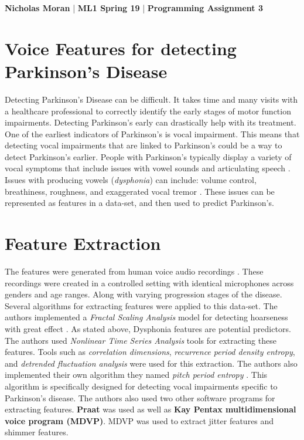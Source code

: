 \setlength{\parindent}{10ex}

\textbf{Nicholas Moran} |
\textbf{ML1 Spring 19} |
\textbf{Programming Assignment 3} 

\section{Voice Features for detecting Parkinson's Disease}
    Detecting Parkinson's Disease can be difficult. 
    It takes time and many visits with a healthcare professional to correctly identify the early stages of motor function impairments.
    Detecting Parkinson's early can drastically help with its treatment.
    One of the earliest indicators of Parkinson's is vocal impairment.
    This means that detecting vocal impairments that are linked to Parkinson's could be a way to detect Parkinson's  earlier.
    People with Parkinson's typically display a variety of vocal symptoms that include issues with vowel sounds and articulating speech \cite{little}.
    Issues with producing vowels (\textit{dysphonia}) can include: volume control, breathiness, roughness, and exaggerated vocal tremor \cite{little}.
    These issues can be represented as features in a data-set, and then used to predict Parkinson's.


\section{Feature Extraction}
    The features were generated from human voice audio recordings \cite{little}.
    These recordings were created in a controlled setting with identical microphones across genders and age ranges.
    Along with varying progression stages of the disease. 
    Several algorithms for extracting features were applied to this data-set.
    The authors implemented a \textit{Fractal Scaling Analysis} model for detecting hoarseness with great effect \cite{McSharry}.
    As stated above, Dysphonia features are potential predictors. 
    The authors used \textit{Nonlinear Time Series Analysis} tools for extracting these features.
    Tools such as \textit{correlation dimensions}, \textit{recurrence period density entropy}, and \textit{detrended fluctuation analysis} were used for this extraction.
    The authors also implemented their own algorithm they named \textit{pitch period entropy} \cite{little}.
    This algorithm is specifically designed for detecting vocal impairments specific to Parkinson's disease.
    The authors also used two other software programs for extracting features.
    \textbf{Praat} was used as well as \textbf{Kay Pentax multidimensional voice program (MDVP)}.
    MDVP was used to extract jitter features and shimmer features.



